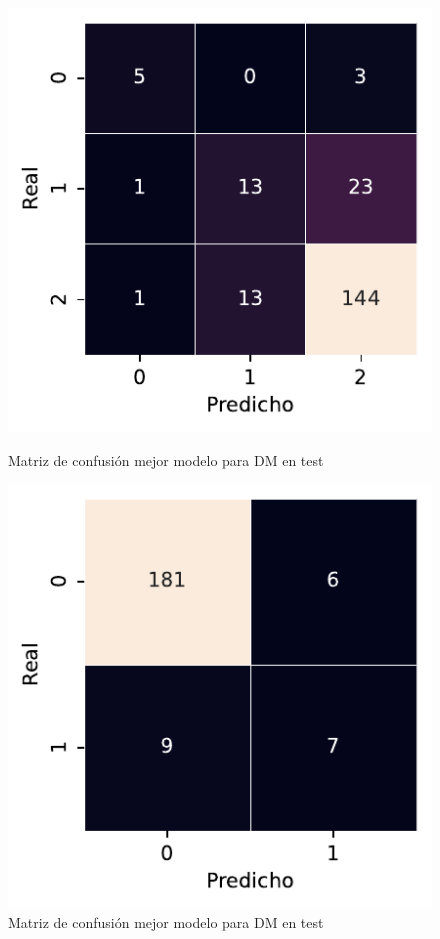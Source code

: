 \begin{figure}[htbp]
    \vspace{1.5em} %

    \includegraphics[width=0.5\linewidth]{figures/5_experiments/multi-dm-cm.pdf}
    \caption{Matriz de confusión mejor modelo para DM en test}
    \label{fig5:DM_confusion_matrix}
    \includegraphics[width=0.5\linewidth]{figures/5_experiments/multi-dp-cm.pdf}
    \caption{Matriz de confusión mejor modelo para DM en test}
\end{figure}

